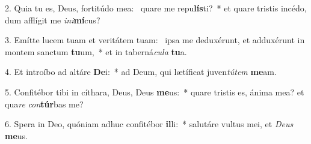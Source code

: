 2. Quia tu es, Deus, fortitúdo mea: \dag\  quare me repu\textbf{lís}ti?~*  et quare tristis incédo, dum afflígit me \textit{in}\textit{i}\textbf{mí}cus?\

3. Emítte lucem tuam et veritátem tuam: \dag\  ipsa me deduxérunt, et adduxérunt in montem sanctum \textbf{tu}um,~*  et in taberná\textit{cu}\textit{la} \textbf{tu}a.\

4. Et introíbo ad altáre \textbf{De}i:~*  ad Deum, qui lætíficat juven\textit{tú}\textit{tem} \textbf{me}am.\

5. Confitébor tibi in cíthara, Deus, Deus \textbf{me}us:~*  quare tristis es, ánima mea? et qua\textit{re} \textit{con}\textbf{túr}bas me?\

6. Spera in Deo, quóniam adhuc confitébor \textbf{il}li:~*  salutáre vultus mei, et \textit{De}\textit{us} \textbf{me}us.\

